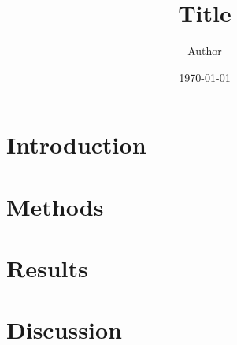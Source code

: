 \documentclass[11pt]{article}
\title{Title}
\author{Author}
\date{\today}
\begin{document}
\maketitle

\section{Introduction}

\section{Methods}

\section{Results}

\section{Discussion}
\end{document}
